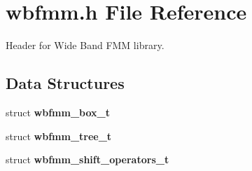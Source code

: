 \section{wbfmm.\+h File Reference}
\label{wbfmm_8h}


Header for Wide Band F\+M\+M library.  


\subsection*{Data Structures}
\begin{DoxyCompactItemize}
\item 
struct {\bf wbfmm\+\_\+box\+\_\+t}
\item 
struct {\bf wbfmm\+\_\+tree\+\_\+t}
\item 
struct {\bf wbfmm\+\_\+shift\+\_\+operators\+\_\+t}
\end{DoxyCompactItemize}
